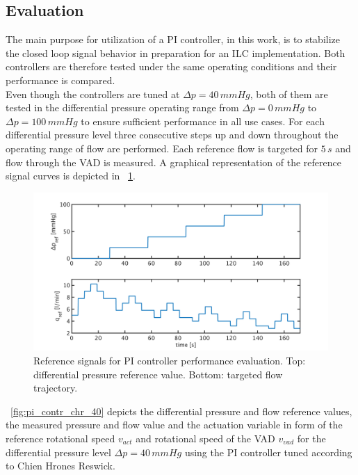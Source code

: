 \subsection{Evaluation}
The main purpose for utilization of a PI controller, in this work, is to stabilize the closed loop signal behavior in preparation for an ILC implementation.
Both controllers are therefore tested under the same operating conditions and their performance is compared.
\\Even though the controllers are tuned at $\Delta{p}=40\,mmHg$, both of them  are tested in the differential pressure operating range from $\Delta{p}=0\,mmHg$ to $\Delta{p}=100\,mmHg$ to ensure sufficient performance in all use cases.
For each differential pressure level three consecutive steps up and down throughout the operating range of flow are performed. Each reference flow is targeted for $5\,s$ and flow through the VAD is measured. A graphical representation of the reference signal curves is depicted in \figurename~\ref{fig:PI_control_ref_signals}.
\begin{figure}[ht]
  \centering
  \includegraphics[width=\textwidth]{images/chapt_5/PI_control_ref_signals.pdf}
  \caption[Reference signals for PI controller performance evaluation]{Reference signals for PI controller performance evaluation. Top: differential pressure reference value. Bottom: targeted flow trajectory.}
  \label{fig:PI_control_ref_signals}
\end{figure}
\figurename~\ref{fig:pi_contr_chr_40} depicts the differential pressure and flow reference values, the measured pressure and flow value and the actuation variable in form of the reference rotational speed $v_{act}$ and rotational speed of the VAD $v_{vad}$ for the differential pressure level $\Delta{p}=40\,mmHg$ using the PI controller tuned according to Chien Hrones Reswick.

